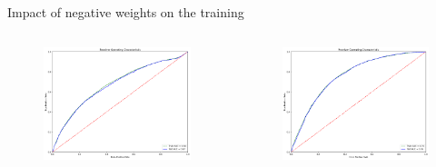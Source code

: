 
\begin{frame}{Impact of negative weights on the training}
    \begin{columns}
        \begin{column}{0.5\textwidth}
            \begin{figure}
                \centering
                \includegraphics[width=\textwidth]{ROC_normalWeights}
            \end{figure}
        \end{column}
        \begin{column}{0.5\textwidth}
            \begin{figure}
                \centering
                \includegraphics[width=\textwidth]{ROC_absoluteWeights}

\end{figure}
\end{column}
\end{columns}
\end{frame}
